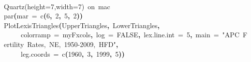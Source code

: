 \documentclass[a4paper]{article}
\newcommand{\hlnumber}[1]{\textcolor[rgb]{0.0823529411764706,0.0784313725490196,0.709803921568627}{#1}}%
\newcommand{\hlfunctioncall}[1]{\textcolor[rgb]{1,0,0}{#1}}%
\newcommand{\hlstring}[1]{\textcolor[rgb]{0.6,0.6,1}{#1}}%
\newcommand{\hlkeyword}[1]{\textcolor[rgb]{0,0,0}{\textbf{#1}}}%
\newcommand{\hlargument}[1]{\textcolor[rgb]{0.694117647058824,0.247058823529412,0.0196078431372549}{#1}}%
\newcommand{\hlcomment}[1]{\textcolor[rgb]{0.8,0.8,0.8}{#1}}%
\newcommand{\hlsymbol}[1]{\textcolor[rgb]{0,0,0}{#1}}%
\newcommand{\hlprompt}[1]{\textcolor[rgb]{0,0,0}{#1}}%
\newcommand{\hlstd}[1]{\textcolor[rgb]{0,0,0}{#1}}%
\newenvironment{Houtput}{\raggedright}{%
%
}
\begin{document}
\begin{Houtput}
\normalfont
\hspace*{\fill}\\
\hlstd{}\ttfamily\noindent
\hlprompt{\usebox{\hlnormalsizeboxgreaterthan}{\ }}\hlcomment{\usebox{\hlnormalsizeboxhash}Quartz(height=7,width=7){\ }on{\ }mac}\mbox{}
\normalfont
\hspace*{\fill}\\
\hlstd{}\ttfamily\noindent
\hlprompt{\usebox{\hlnormalsizeboxgreaterthan}{\ }}\hlfunctioncall{par}\hlkeyword{(}\hlargument{mar}{\ }\hlargument{=}{\ }\hlfunctioncall{c}\hlkeyword{(}\hlnumber{6}\hlkeyword{,}{\ }\hlnumber{2}\hlkeyword{,}{\ }\hlnumber{5}\hlkeyword{,}{\ }\hlnumber{2}\hlkeyword{)}\hlkeyword{)}\mbox{}
\normalfont
\hspace*{\fill}\\
\hlstd{}\ttfamily\noindent
\hlprompt{\usebox{\hlnormalsizeboxgreaterthan}{\ }}\hlfunctioncall{PlotLexisTriangles}\hlkeyword{(}\hlsymbol{UpperTriangles}\hlkeyword{,}{\ }\hlsymbol{LowerTriangles}\hlkeyword{,}\hspace*{\fill}\\
\hlstd{}\hlprompt{{\ }}{\ }{\ }{\ }{\ }\hlargument{colorramp}{\ }\hlargument{=}{\ }\hlsymbol{myFxcols}\hlkeyword{,}{\ }\hlargument{log}{\ }\hlargument{=}{\ }\hlnumber{FALSE}\hlkeyword{,}{\ }\hlargument{lex.line.int}{\ }\hlargument{=}{\ }\hlnumber{5}\hlkeyword{,}{\ }\hlargument{main}{\ }\hlargument{=}{\ }\hlstring{"APC{\ }Fertility{\ }Rates,{\ }NE,{\ }1950-2009,{\ }HFD"}\hlkeyword{,}\hspace*{\fill}\\
\hlstd{}\hlprompt{{\ }}{\ }{\ }{\ }{\ }\hlargument{leg.coords}{\ }\hlargument{=}{\ }\hlfunctioncall{c}\hlkeyword{(}\hlnumber{1960}\hlkeyword{,}{\ }\hlnumber{3}\hlkeyword{,}{\ }\hlnumber{1999}\hlkeyword{,}{\ }\hlnumber{5}\hlkeyword{)}\hlkeyword{)}\mbox{}
\normalfont
\hspace*{\fill}\\
\hlstd{}
\end{Houtput}
\end{document}
